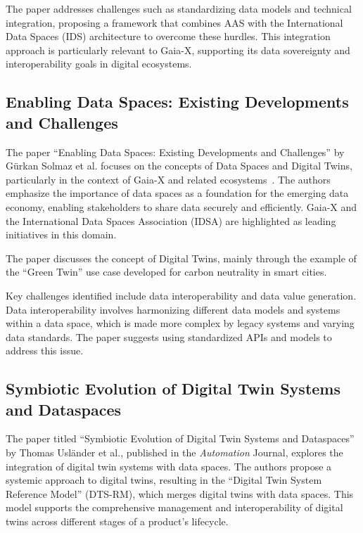 The paper addresses challenges such as standardizing data models and technical integration, proposing a framework that combines AAS with the International Data Spaces (IDS) architecture to overcome these hurdles.
This integration approach is particularly relevant to Gaia-X, supporting its data sovereignty and interoperability goals in digital ecosystems.

\subsection{Enabling Data Spaces: Existing Developments and Challenges}\label{subsec:enabling-data-spaces:-existing-developments-and-challenges}

The paper ``Enabling Data Spaces: Existing Developments and Challenges'' by Gürkan Solmaz et al. focuses on the concepts of Data Spaces and Digital Twins, particularly in the context of Gaia-X and related ecosystems~\cite{enabling_data_spaces}.
The authors emphasize the importance of data spaces as a foundation for the emerging data economy, enabling stakeholders to share data securely and efficiently.
Gaia-X and the International Data Spaces Association (IDSA) are highlighted as leading initiatives in this domain.

The paper discusses the concept of Digital Twins, mainly through the example of the ``Green Twin'' use case developed for carbon neutrality in smart cities.

Key challenges identified include data interoperability and data value generation.
Data interoperability involves harmonizing different data models and systems within a data space, which is made more complex by legacy systems and varying data standards.
The paper suggests using standardized APIs and models to address this issue.

\subsection{Symbiotic Evolution of Digital Twin Systems and Dataspaces}\label{subsec:symbiotic-evolution-of-digital-twin-systems-and-dataspaces}

The paper titled ``Symbiotic Evolution of Digital Twin Systems and Dataspaces'' by Thomas Usländer et al., published in the \textit{Automation} Journal, explores the integration of digital twin systems with data spaces.
The authors propose a systemic approach to digital twins, resulting in the ``Digital Twin System Reference Model'' (DTS-RM), which merges digital twins with data spaces.
This model supports the comprehensive management and interoperability of digital twins across different stages of a product's lifecycle.

